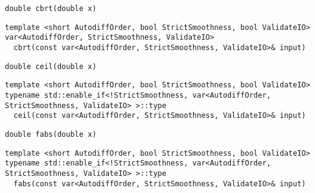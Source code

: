 \begin{tcolorbox}[colback=white,colframe=gray90, coltitle=black,boxrule=3pt,
fonttitle=\bfseries,title= Cbrt]

\begin{verbatim}
double cbrt(double x)

\end{verbatim}

\begin{verbatim}
template <short AutodiffOrder, bool StrictSmoothness, bool ValidateIO>
var<AutodiffOrder, StrictSmoothness, ValidateIO>
  cbrt(const var<AutodiffOrder, StrictSmoothness, ValidateIO>& input)

\end{verbatim}

\end{tcolorbox}

\begin{tcolorbox}[colback=white,colframe=gray90, coltitle=black,boxrule=3pt,
fonttitle=\bfseries,title= Ceil]

\begin{verbatim}
double ceil(double x)

\end{verbatim}

\begin{verbatim}
template <short AutodiffOrder, bool StrictSmoothness, bool ValidateIO>
typename std::enable_if<!StrictSmoothness, var<AutodiffOrder, StrictSmoothness, ValidateIO> >::type
  ceil(const var<AutodiffOrder, StrictSmoothness, ValidateIO>& input)

\end{verbatim}

\end{tcolorbox}

\begin{tcolorbox}[colback=white,colframe=gray90, coltitle=black,boxrule=3pt,
fonttitle=\bfseries,title= Fabs]

\begin{verbatim}
double fabs(double x)

\end{verbatim}

\begin{verbatim}
template <short AutodiffOrder, bool StrictSmoothness, bool ValidateIO>
typename std::enable_if<!StrictSmoothness, var<AutodiffOrder, StrictSmoothness, ValidateIO> >::type
  fabs(const var<AutodiffOrder, StrictSmoothness, ValidateIO>& input)

\end{verbatim}

\end{tcolorbox}

